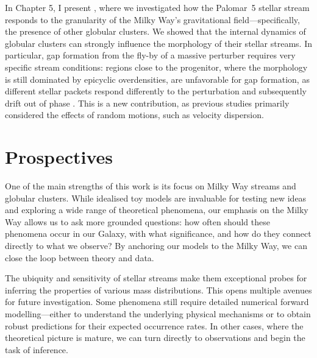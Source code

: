     In Chapter 5, I present \citet{2025A&A...699A.289F}, where we investigated how the Palomar~5 stellar stream responds to the granularity of the Milky Way's gravitational field—specifically, the presence of other globular clusters. We showed that the internal dynamics of globular clusters can strongly influence the morphology of their stellar streams. In particular, gap formation from the fly-by of a massive perturber requires very specific stream conditions: regions close to the progenitor, where the morphology is still dominated by epicyclic overdensities, are unfavorable for gap formation, as different stellar packets respond differently to the perturbation and subsequently drift out of phase . This is a new contribution, as previous studies primarily considered the effects of random motions, such as velocity dispersion.

\section{Prospectives}
    One of the main strengths of this work is its focus on Milky Way streams and globular clusters. While idealised toy models are invaluable for testing new ideas and exploring a wide range of theoretical phenomena, our emphasis on the Milky Way allows us to ask more grounded questions: how often should these phenomena occur in our Galaxy, with what significance, and how do they connect directly to what we observe? By anchoring our models to the Milky Way, we can close the loop between theory and data.

    The ubiquity and sensitivity of stellar streams make them exceptional probes for inferring the properties of various mass distributions. This opens multiple avenues for future investigation. Some phenomena still require detailed numerical forward modelling—either to understand the underlying physical mechanisms or to obtain robust predictions for their expected occurrence rates. In other cases, where the theoretical picture is mature, we can turn directly to observations and begin the task of inference.
    
